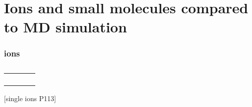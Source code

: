 
\chapter{Ions and small molecules compared to MD simulation\label{chpt:ions}}


\subsection{ions}

\begin{table}[h]
\begin{centering}
\begin{tabular*}{1\linewidth}{@{\extracolsep{\fill}}llll}
\toprule 
 &  &  & \tabularnewline
\midrule
 &  &  & \tabularnewline
 &  &  & \tabularnewline
 &  &  & \tabularnewline
 &  &  & \tabularnewline
\bottomrule
\end{tabular*}
\par\end{centering}

\caption[]{}
\end{table}


{[}single ions P113{]}
